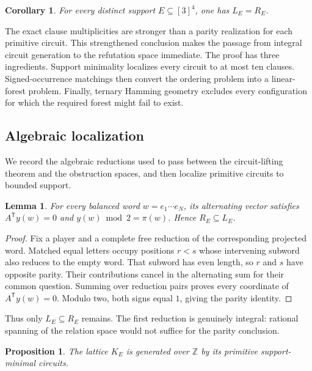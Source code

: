 \documentclass[11pt]{article}
\newtheorem{proposition}[theorem]{Proposition}
\newtheorem{lemma}[theorem]{Lemma}
\newtheorem{corollary}[theorem]{Corollary}
\theoremstyle{definition}
\theoremstyle{remark}
\newcommand{\Z}{\mathbb{Z}}
\numberwithin{equation}{section}
\begin{document}
\begin{corollary}
\label{cor:obstruction-exactness}
For every distinct support \(E\subseteq[3]^4\), one has \(L_E=R_E\).
\end{corollary}

The exact clause multiplicities are stronger than a parity realization for
each primitive circuit.  This strengthened
conclusion makes the passage from integral circuit generation to the
refutation space immediate.  The proof has three ingredients.  Support minimality
localizes every circuit to at most ten clauses.  Signed-occurrence matchings
then convert the ordering problem into a linear-forest problem.  Finally,
ternary Hamming geometry excludes every configuration for which the required
forest might fail to exist.

\subsection{Algebraic localization}\label{sec:parity}

We record the algebraic reductions used to pass between the circuit-lifting
theorem and the obstruction spaces, and then localize primitive circuits to
bounded support.

\begin{lemma}\label{lem:alternating-lift}
For every balanced word \(w=e_1\cdots e_N\), its alternating vector
satisfies \(A^{\mathsf T}y(w)=0\) and
\(y(w)\bmod2=\pi(w)\).  Hence \(R_E\subseteq L_E\).
\end{lemma}

\begin{proof}
Fix a player and a complete free reduction of the corresponding projected
word.  Matched equal letters
occupy positions \(r<s\) whose intervening subword also reduces to the
empty word.  That subword has even length, so \(r\) and \(s\) have opposite
parity.  Their contributions cancel in the alternating sum for their common
question.  Summing over reduction pairs proves every coordinate of
\(A^{\mathsf T}y(w)=0\).  Modulo two, both signs equal \(1\), giving the
parity identity.
\end{proof}

Thus only \(L_E\subseteq R_E\) remains.  The first reduction is genuinely
integral: rational spanning of the relation space would not suffice for the
parity conclusion.

\begin{proposition}\label{prop:circuit-generation}
The lattice \(K_E\) is generated over \(\Z\) by its primitive
support-minimal circuits.
\end{proposition}
\end{document}
